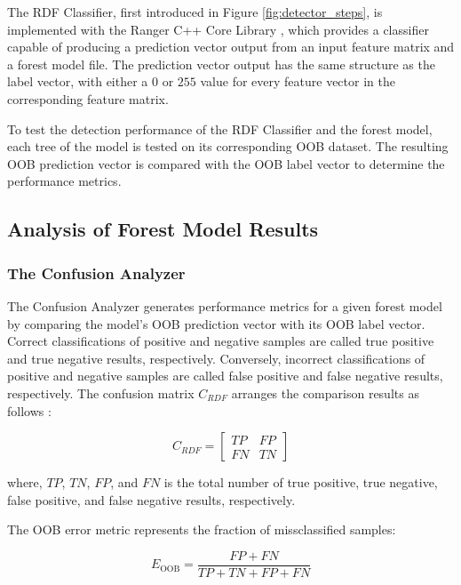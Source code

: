 The RDF Classifier, first introduced in Figure \ref{fig:detector_steps}, is implemented with the Ranger C++ Core Library \cite{Wright2017}, which provides a classifier capable of producing a prediction vector output from an input feature matrix and a forest model file. The prediction vector output has the same structure as the label vector, with either a $0$ or $255$ value for every feature vector in the corresponding feature matrix.


To test the detection performance of the RDF Classifier and the forest model, each tree of the model is tested on its corresponding OOB dataset. The resulting OOB prediction vector is compared with the OOB label vector to determine the performance metrics.

\subsection{Analysis of Forest Model Results}

\subsubsection{The Confusion Analyzer}

\def\FCM{C_{RDF}}
The Confusion Analyzer generates performance metrics for a given forest model by comparing the model's OOB prediction vector with its OOB label vector. Correct classifications of positive and negative samples are called true positive and true negative results, respectively. Conversely, incorrect classifications of positive and negative samples are called false positive and false negative results, respectively. The confusion matrix $\FCM$ arranges the comparison results as follows \cite{Stehman1997}:

\begin{equation}
  \label{eq:confusion}
  \FCM = \left[\begin{matrix}
    TP & FP \\
    FN & TN
  \end{matrix}\right]
\end{equation}

where, $TP$, $TN$, $FP$, and $FN$ is the total number of true positive, true negative, false positive, and false negative results, respectively.

The OOB error metric represents the fraction of missclassified samples:

\def\OOBE{E_{\text{OOB}}}
\begin{equation}
  \label{eq:oob_error}
  \OOBE = \frac{FP+FN}{TP+TN+FP+FN}
\end{equation}

